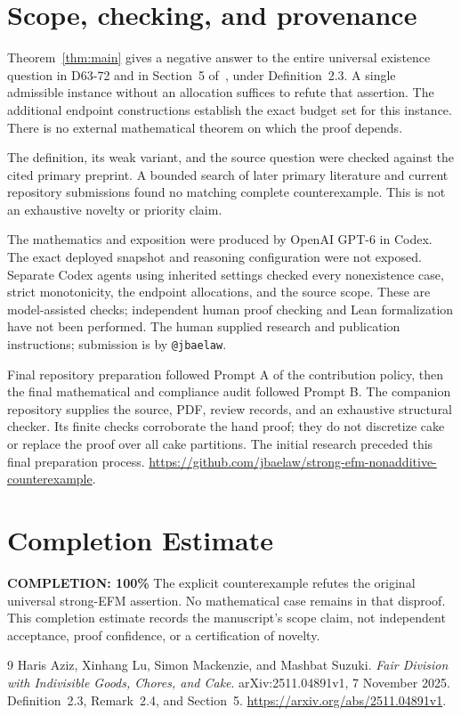 \documentclass[11pt,a4paper]{article}
\begin{document}
\section{Scope, checking, and provenance}

Theorem~\ref{thm:main} gives a negative answer to the entire universal
existence question in D63-72 and in Section~5 of~\cite{ALMS}, under
Definition~2.3. A single admissible instance without an allocation
suffices to refute that assertion. The additional endpoint constructions
establish the exact budget set for this instance. There is no external
mathematical theorem on which the proof depends.

The definition, its weak variant, and the source question were checked
against the cited primary preprint. A bounded search of later primary
literature and current repository submissions found no matching complete
counterexample. This is not an exhaustive novelty or priority claim.

The mathematics and exposition were produced by OpenAI GPT-6 in Codex.
The exact deployed snapshot and reasoning configuration were not exposed.
Separate Codex agents using inherited settings checked every nonexistence
case, strict monotonicity, the endpoint allocations, and the source scope.
These are model-assisted checks; independent human proof checking and
Lean formalization have not been performed. The human supplied research
and publication instructions; submission is by \texttt{@jbaelaw}.

Final repository preparation followed Prompt A of the contribution policy,
then the final mathematical and compliance audit followed Prompt B.
The companion repository supplies the source, PDF, review records, and
an exhaustive structural checker. Its finite checks corroborate the hand
proof; they do not discretize cake or replace the proof over all cake
partitions. The initial research preceded this final preparation process.
\url{https://github.com/jbaelaw/strong-efm-nonadditive-counterexample}.

\section{Completion Estimate}
\noindent\textbf{COMPLETION: 100\%}
The explicit counterexample refutes the original universal strong-EFM
assertion. No mathematical case remains in that disproof. This completion
estimate records the manuscript's scope claim, not independent acceptance,
proof confidence, or a certification of novelty.

\begin{thebibliography}{9}
Haris Aziz, Xinhang Lu, Simon Mackenzie, and Mashbat Suzuki.
\emph{Fair Division with Indivisible Goods, Chores, and Cake}.
arXiv:2511.04891v1, 7 November 2025.
Definition~2.3, Remark~2.4, and Section~5.
\url{https://arxiv.org/abs/2511.04891v1}.
\end{thebibliography}
\end{document}
